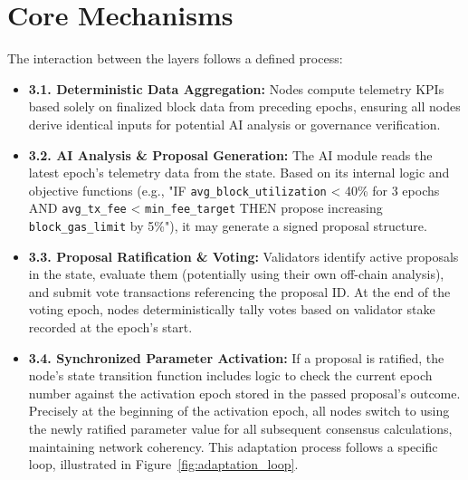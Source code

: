 \documentclass[11pt]{article}
\begin{document}
\section{Core Mechanisms}
The interaction between the layers follows a defined process:

\begin{itemize}
    \item \textbf{3.1. Deterministic Data Aggregation:} Nodes compute telemetry KPIs based solely on finalized block data from preceding epochs, ensuring all nodes derive identical inputs for potential AI analysis or governance verification.
    
    \item \textbf{3.2. AI Analysis \& Proposal Generation:} The AI module reads the latest epoch's telemetry data from the state. Based on its internal logic and objective functions (e.g., "IF \texttt{avg\_block\_utilization} < 40\% for 3 epochs AND \texttt{avg\_tx\_fee} < \texttt{min\_fee\_target} THEN propose increasing \texttt{block\_gas\_limit} by 5\%"), it may generate a signed proposal structure.
    
    \item \textbf{3.3. Proposal Ratification \& Voting:} Validators identify active proposals in the state, evaluate them (potentially using their own off-chain analysis), and submit vote transactions referencing the proposal ID. At the end of the voting epoch, nodes deterministically tally votes based on validator stake recorded at the epoch's start.
    
    \item \textbf{3.4. Synchronized Parameter Activation:} If a proposal is ratified, the node's state transition function includes logic to check the current epoch number against the activation epoch stored in the passed proposal's outcome. Precisely at the beginning of the activation epoch, all nodes switch to using the newly ratified parameter value for all subsequent consensus calculations, maintaining network coherency. This adaptation process follows a specific loop, illustrated in Figure~\ref{fig:adaptation_loop}.
\end{itemize}
\end{document}
